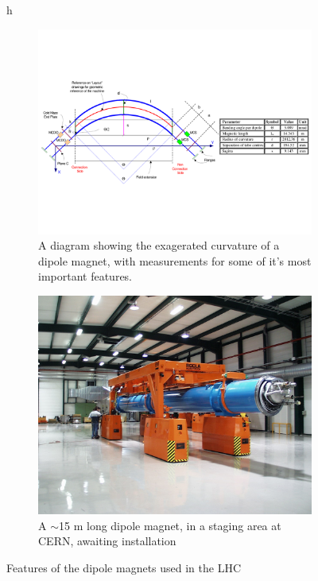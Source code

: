 \begin{figure}{h}
\begin{subfigure}[h]{0.450\textwidth}
        \includegraphics[width=\textwidth]{Figures/LHC_Diagrams/LHC_Dipole_ExageratedCurvature.pdf}
        \caption{A diagram showing the exagerated curvature of a
          dipole magnet, with measurements for some of it's most
          important features. }\label{fig:lhc_dipole_curvature}
      \end{subfigure}
      \begin{subfigure}[h]{0.450\textwidth}
        \includegraphics[width=\textwidth]{Figures/LHC_Diagrams/LHC_Dipole_transp-2001-001_05.jpg}
        \caption{A $\sim$15 m long dipole magnet, in a staging area at
        CERN, awaiting installation}\label{fig:lhc_dipole_staging}
      \end{subfigure}
       \caption{Features of the dipole magnets used in the LHC}\label{fig:lhc_dipole}
\end{figure}

